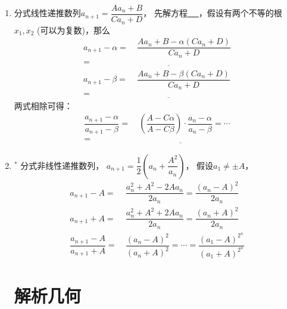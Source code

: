 \documentclass{article}
\newif\ifte
\begin{document}
\begin{multicols}{2}
\begin{enumerate}[leftmargin=20pt]
\item 分式线性递推数列$ a_{n+1}=\dfrac{Aa_n+B}{Ca_n+D} $，
先解方程\underline{\ \ifte $ x=\dfrac{Ax+B}{Cx+D} $
\else \hspace{2cm} \fi\ }，假设有两个不等的根$ x_1,x_2 $
(可以为复数)，那么
\begin{align*}
    a_{n+1}-\alpha =&\ \dfrac{Aa_n+B-\alpha(Ca_n+D)}{Ca_n+D}\\
    =&\ \underline{\ \ifte \dfrac{(A-C\alpha)(a_n-\alpha)}{Ca_n+D}
        \else \hspace{3cm} \fi\ } \\
    a_{n+1}-\beta =&\ \dfrac{Aa_n+B-\beta(Ca_n+D)}{Ca_n+D} \\
    =&\ \underline{\ \ifte \dfrac{(A-C\beta)(a_n-\beta)}{Ca_n+D}
        \else \hspace{3cm} \fi\ }	
\end{align*}
两式相除可得：
\begin{align*}
    \dfrac{a_{n+1}-\alpha}{a_{n+1}-\beta}
    =&\ \left( \dfrac{A-C\alpha}{A-C\beta}\right) \cdot 
    \dfrac{a_{n}-\alpha}{a_{n}-\beta}=\cdots \\
    =&\ \underline{\ \ifte \left( \dfrac{A-C\alpha}{A-C\beta}
       \right)^{n} \cdot \dfrac{a_{1}-\alpha}{a_{1}-\beta}
       \else \hspace{4cm} \fi\ }
\end{align*}

\item $^*$ 分式非线性递推数列，
$ a_{n+1}=\dfrac{1}{2}\left(a_n+\dfrac{A^2}{a_n}\right) $，
假设$ a_1\neq \pm A $，
\begin{align*}
    a_{n+1}-A =&\ \dfrac{a_n^2+A^2-2Aa_n}{2a_n}=\dfrac{(a_n-A)^2}{2a_n} \\
    a_{n+1}+A =&\ \dfrac{a_n^2+A^2+2Aa_n}{2a_n}=\dfrac{(a_n+A)^2}{2a_n} \\
    \dfrac{a_{n+1}-A}{a_{n+1}+A} =&\ \dfrac{(a_{n}-A)^2}{(a_{n}+A)^2}=
    \cdots = \dfrac{(a_{1}-A)^{2^n}}{(a_{1}+A)^{2^n}}
\end{align*}


\section{解析几何}


\end{enumerate}
\end{multicols}
\end{document}
